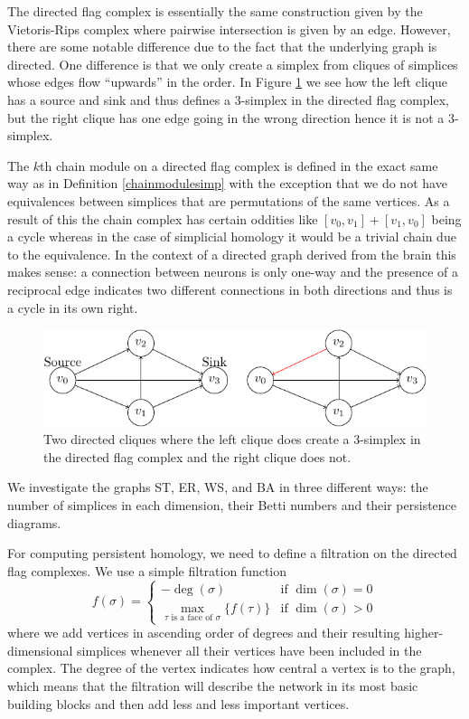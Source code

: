 The directed flag complex is essentially the same construction given by the Vietoris-Rips complex where pairwise intersection is given by an edge. However, there are some notable difference due to the fact that the underlying graph is directed. One difference is that we only create a simplex from cliques of simplices whose edges flow ``upwards'' in the order. In Figure \ref{disimplex} we see how the left clique has a source and sink and thus defines a $3$-simplex in the directed flag complex, but the right clique has one edge going in the wrong direction hence it is not a $3$-simplex.

The $k$th chain module on a directed flag complex is defined in the exact same way as in Definition \ref{chainmodulesimp} with the exception that we do not have equivalences between simplices that are permutations of the same vertices. As a result of this the chain complex has certain oddities like $[v_{0},v_{1}]+[v_{1},v_{0}]$ being a cycle whereas in the case of simplicial homology it would be a trivial chain due to the equivalence. In the context of a directed graph derived from the brain this makes sense: a connection between neurons is only one-way and the presence of a reciprocal edge indicates two different connections in both directions and thus is a cycle in its own right.

\begin{figure}[ht]
  \centering
  \includegraphics[]{./3simplex.pdf}
  \caption{\label{disimplex} Two directed cliques where the left clique does create a 3-simplex in the directed flag complex and the right clique does not.}
\end{figure}

We investigate the graphs ST, ER, WS, and BA in three different ways: the number of simplices in each dimension, their Betti numbers and their persistence diagrams.

For computing persistent homology, we need to define a filtration on the directed flag complexes.
We use a simple filtration function
\[
  f(\sigma) = \begin{cases}
    -\deg(\sigma) & \text{if } \dim(\sigma) = 0 \\
    \max_{\tau \text{ is a face of } \sigma} \{ f(\tau) \} & \text{if } \dim(\sigma) > 0
  \end{cases}
\] where we add vertices in ascending order of degrees and their resulting higher-dimensional simplices whenever all their vertices have been included in the complex. The degree of the vertex indicates how central a vertex is to the graph, which means that the filtration will describe the network in its most basic building blocks and then add less and less important vertices.
